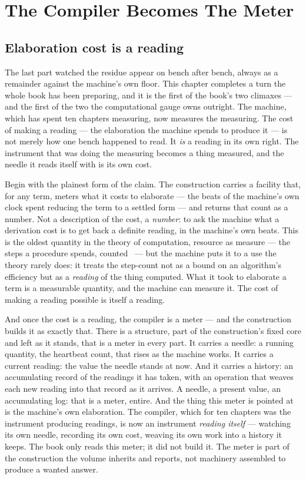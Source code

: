 \chapter{The Compiler Becomes The Meter}

\section{Elaboration cost is a reading}

The last part watched the residue appear on bench after bench, always as a remainder against the machine's own floor.
This chapter completes a turn the whole book has been preparing, and it is the first of the book's two climaxes --- and
the first of the two the computational gauge owns outright. The machine, which has spent ten chapters measuring, now
measures the measuring. The cost of making a reading --- the elaboration the machine spends to produce it --- is not
merely how one bench happened to read. It \emph{is} a reading in its own right. The instrument that was doing the
measuring becomes a thing measured, and the needle it reads itself with is its own cost.

Begin with the plainest form of the claim. The construction carries a facility that, for any term, meters what it costs
to elaborate --- the beats of the machine's own clock spent reducing the term to a settled form --- and returns that
count as a number. Not a description of the cost, a \emph{number}: to ask the machine what a derivation cost is to get
back a definite reading, in the machine's own beats. This is the oldest quantity in the theory of computation, resource
as measure --- the steps a procedure spends, counted~\cite{sipser1997, cook1974} --- but the machine puts it to a use the
theory rarely does: it treats the step-count not as a bound on an algorithm's efficiency but as a \emph{reading} of the
thing computed. What it took to elaborate a term is a measurable quantity, and the machine can measure it. The cost of
making a reading possible is itself a reading.

And once the cost is a reading, the compiler is a meter --- and the construction builds it as exactly that. There is a
structure, part of the construction's fixed core and left as it stands, that is a meter in every part. It carries a
needle: a running quantity, the heartbeat count, that rises as the machine works. It carries a current reading: the
value the needle stands at now. And it carries a history: an accumulating record of the readings it has taken, with an
operation that weaves each new reading into that record as it arrives. A needle, a present value, an accumulating log:
that is a meter, entire. And the thing this meter is pointed at is the machine's own elaboration. The compiler, which for
ten chapters was the instrument producing readings, is now an instrument \emph{reading itself} --- watching its own
needle, recording its own cost, weaving its own work into a history it keeps. The book only reads this meter; it did not
build it. The meter is part of the construction the volume inherits and reports, not machinery assembled to produce a
wanted answer.

